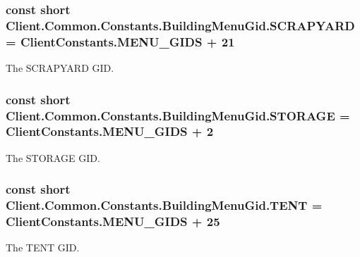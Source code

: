 \subsubsection[{S\+C\+R\+A\+P\+Y\+A\+R\+D}]{\setlength{\rightskip}{0pt plus 5cm}const short Client.\+Common.\+Constants.\+Building\+Menu\+Gid.\+S\+C\+R\+A\+P\+Y\+A\+R\+D = {\bf Client\+Constants.\+M\+E\+N\+U\+\_\+\+G\+I\+D\+S} + 21}\label{classClient_1_1Common_1_1Constants_1_1BuildingMenuGid_a95f094cd2083fab3716e64697fbe8a55}


The S\+C\+R\+A\+P\+Y\+A\+R\+D G\+I\+D. 

\hypertarget{classClient_1_1Common_1_1Constants_1_1BuildingMenuGid_a140226a4ce1dde3dfb4d0f04097544cf}{}
\subsubsection[{S\+T\+O\+R\+A\+G\+E}]{\setlength{\rightskip}{0pt plus 5cm}const short Client.\+Common.\+Constants.\+Building\+Menu\+Gid.\+S\+T\+O\+R\+A\+G\+E = {\bf Client\+Constants.\+M\+E\+N\+U\+\_\+\+G\+I\+D\+S} + 2}\label{classClient_1_1Common_1_1Constants_1_1BuildingMenuGid_a140226a4ce1dde3dfb4d0f04097544cf}


The S\+T\+O\+R\+A\+G\+E G\+I\+D. 

\hypertarget{classClient_1_1Common_1_1Constants_1_1BuildingMenuGid_a9112e4dd5f8d2d7da2dbf7144d42c8d2}{}
\subsubsection[{T\+E\+N\+T}]{\setlength{\rightskip}{0pt plus 5cm}const short Client.\+Common.\+Constants.\+Building\+Menu\+Gid.\+T\+E\+N\+T = {\bf Client\+Constants.\+M\+E\+N\+U\+\_\+\+G\+I\+D\+S} + 25}\label{classClient_1_1Common_1_1Constants_1_1BuildingMenuGid_a9112e4dd5f8d2d7da2dbf7144d42c8d2}


The T\+E\+N\+T G\+I\+D. 

